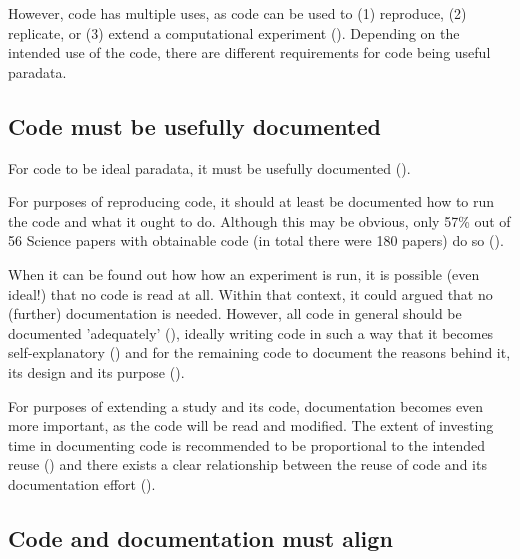 However, code has multiple uses,
as code can be used to (1) reproduce, (2) replicate, or (3)
extend a computational experiment (\cite{benureau2018re}).
Depending on the intended use of the code,
there are different requirements for code being useful paradata.

\subsection{Code must be usefully documented}

For code to be ideal paradata, it must be usefully 
documented (\cite{huvila2022improving}).

For purposes of reproducing code,
it should at least be documented how to run the code and what it ought to do.
Although this may be obvious, only 57\% out of 56 Science papers 
with obtainable code (in total there were 180 papers) 
do so (\cite{stodden2018empirical}).

When it can be found out how how an experiment is run, 
it is possible (even ideal!) that no code is read at all.
Within that context, it could argued that no (further) documentation is needed.
However, all code in general should be documented 
'adequately' (\cite{peng2006reproducible}),
ideally writing code in such a way that it becomes 
self-explanatory (\cite{wilson2014best})
and for the remaining code to document the reasons behind it, 
its design and its purpose (\cite{wilson2014best}).

For purposes of extending a study and its code, 
documentation becomes even more important,
as the code will be read and modified.
The extent of investing time in documenting code is recommended
to be proportional to the intended reuse (\cite{pianosi2020successfully})
and there exists a clear relationship between the reuse 
of code and its documentation 
effort (\cite{cosentino2017systematic,hata2015characteristics}).

\subsection{Code and documentation must align}

